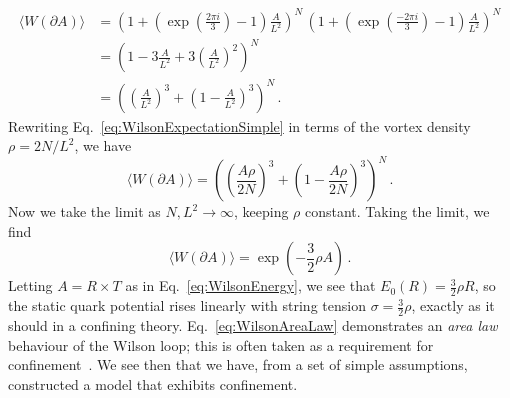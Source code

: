 %
\begin{align}
\langle W(\partial A)\rangle &=\left(1+\left(\exp\left(\frac{2\pi i}{3}\right) - 1\right)\frac{A}{L^2}\right)^N\, \left(1+\left(\exp\left(\frac{-2\pi i}{3}\right) - 1\right)\frac{A}{L^2}\right)^N\nonumber\\
&=\left(1 -3\frac{A}{L^2} + 3\left(\frac{A}{L^2}\right)^2\right)^N\nonumber\\
&= \left(\left(\frac{A}{L^2}\right)^3+\left(1-\frac{A}{L^2}\right)^3\right)^N\, .\label{eq:WilsonExpectationSimple}
\end{align}
%
Rewriting Eq.~\eqref{eq:WilsonExpectationSimple} in terms of the vortex density $\rho = 2N/L^2$, we have
%
\begin{equation}
\langle W(\partial A)\rangle = \left(\left(\frac{A\rho}{2N}\right)^3+\left(1-\frac{A\rho}{2N}\right)^3\right)^N\, .
\end{equation}
%
Now we take the limit as $N,L^2\rightarrow\infty$, keeping $\rho$ constant. Taking the limit, we find
%
\begin{equation}
\langle W(\partial A)\rangle = \exp\left(-\frac{3}{2}\rho A\right)\, .
\label{eq:WilsonAreaLaw}
\end{equation}
%
Letting $A=R\times T$ as in Eq.~\eqref{eq:WilsonEnergy}, we see that $E_0(R) = \frac{3}{2}\rho R$, so the static quark potential rises linearly with string tension $\sigma = \frac{3}{2}\rho$, exactly as it should in a confining theory. Eq.~\eqref{eq:WilsonAreaLaw} demonstrates an {\it area law} behaviour of the Wilson loop; this is often taken as a requirement for confinement~\cite{DelDebbio:1998luz,Dosch:1988ha}. We see then that we have, from a set of simple assumptions, constructed a model that exhibits confinement.\\

